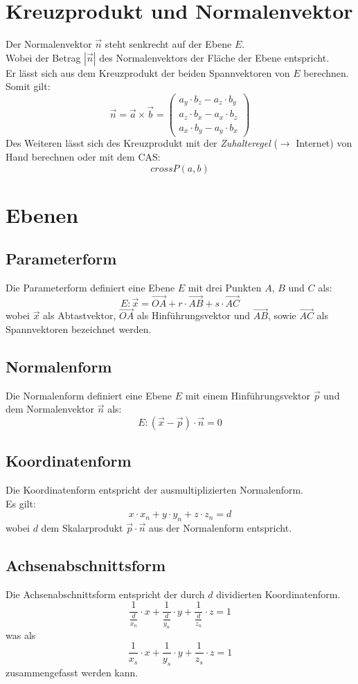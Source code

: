\documentclass[a4paper,12pt]{article}
\begin{document}
\section{Kreuzprodukt und Normalenvektor}
Der Normalenvektor $\vec{n}$ steht senkrecht auf der Ebene $E$.\\
Wobei der Betrag $|\vec{n}|$ des Normalenvektors der Fläche der Ebene entspricht.\\
Er lässt sich aus dem Kreuzprodukt der beiden Spannvektoren von $E$ berechnen. Somit gilt:
$$\vec{n} = \vec{a} \times \vec{b} = \begin{pmatrix}a_y \cdot b_z - a_z \cdot b_y\\a_z \cdot b_x - a_x \cdot b_z\\a_x \cdot b_y - a_y \cdot b_x\end{pmatrix}$$
Des Weiteren lässt sich des Kreuzprodukt mit der \textit{Zuhalteregel} ($\rightarrow$ Internet) von Hand berechnen oder mit dem CAS:\\
$$crossP(a,b)$$
\section{Ebenen}
\subsection{Parameterform}
Die Parameterform definiert eine Ebene $E$ mit drei Punkten $A$, $B$ und $C$ als:
$$E : \vec{x} = \vec{OA} + r \cdot \vec{AB} + s \cdot \vec{AC}$$
wobei $\vec{x}$ als Abtastvektor, $\vec{OA}$ als Hinführungsvektor und $\vec{AB}$, sowie $\vec{AC}$ als Spannvektoren bezeichnet werden.
\subsection{Normalenform}
Die Normalenform definiert eine Ebene $E$ mit einem Hinführungsvektor $\vec{p}$ und dem Normalenvektor $\vec{n}$ als:
$$E : (\vec{x} - \vec{p}) \cdot \vec{n} = 0$$
\subsection{Koordinatenform}
Die Koordinatenform entspricht der ausmultiplizierten Normalenform.\\
Es gilt:
$$x \cdot x_n + y \cdot y_n + z \cdot z_n = d$$
wobei $d$ dem Skalarprodukt $\vec{p} \cdot \vec{n}$ aus der Normalenform entspricht.
\subsection{Achsenabschnittsform}
Die Achsenabschnittsform entspricht der durch $d$ dividierten Koordinatenform.
$$\frac{1}{\frac{d}{x_n}} \cdot x + \frac{1}{\frac{d}{y_n}} \cdot y + \frac{1}{\frac{d}{z_n}} \cdot z = 1$$
was als 
$$\frac{1}{x_s} \cdot x + \frac{1}{y_s} \cdot y + \frac{1}{z_s} \cdot z = 1$$
zusammengefasst werden kann.
\end{document}
